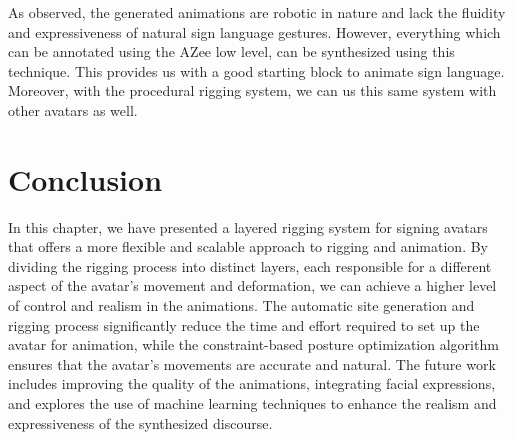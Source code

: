 \documentclass[../../main.tex]{subfiles}
\begin{document}
As observed, the generated animations are robotic in nature and lack the fluidity and expressiveness of natural sign language gestures. However, everything which can be annotated using the AZee low level, can be synthesized using this technique. This provides us with a good starting block to animate sign language. Moreover, with the procedural rigging system, we can us this same system with other avatars as well.

\section{Conclusion}
\label{ch:rigging_layers:conclusion}

In this chapter, we have presented a layered rigging system for signing avatars that offers a more flexible and scalable approach to rigging and animation. By dividing the rigging process into distinct layers, each responsible for a different aspect of the avatar's movement and deformation, we can achieve a higher level of control and realism in the animations. The automatic site generation and rigging process significantly reduce the time and effort required to set up the avatar for animation, while the constraint-based posture optimization algorithm ensures that the avatar's movements are accurate and natural. The future work includes improving the quality of the animations, integrating facial expressions, and explores the use of machine learning techniques to enhance the realism and expressiveness of the synthesized discourse.
\end{document}
